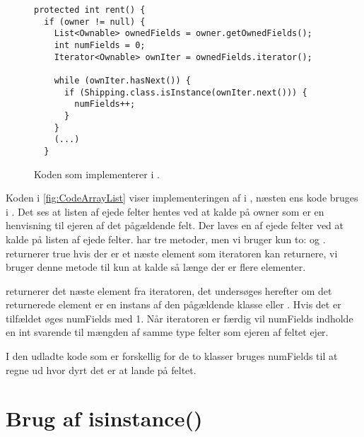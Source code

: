 \begin{figure}
\caption{Koden som implementerer  i .}
\label{fig:CodeIterator}
\centering
\begin{lstlisting}
protected int rent() {
  if (owner != null) {
    List<Ownable> ownedFields = owner.getOwnedFields();
    int numFields = 0;
    Iterator<Ownable> ownIter = ownedFields.iterator();

    while (ownIter.hasNext()) {
      if (Shipping.class.isInstance(ownIter.next())) {
        numFields++;
      }
    }
    (...)
  }
\end{lstlisting}
\end{figure}

Koden i \vref{fig:CodeArrayList} viser implementeringen af  i , næsten ens kode bruges i . Det ses at listen af ejede felter hentes ved at kalde  på owner som er en henvisning til ejeren af det pågældende felt. Der laves en  af ejede felter ved at kalde  på listen af ejede felter.  har tre metoder, men vi bruger kun to:  og .  returnerer true hvis der er et næste element som iteratoren kan returnere, vi bruger denne metode til kun at kalde  så længe der er flere elementer.\cite{javaUtilIterator}

 returnerer det næste element fra iteratoren, det undersøges herefter om det returnerede element er en instans af den pågældende klasse  eller . Hvis det er tilfældet øges numFields med 1. Når iteratoren er færdig vil numFields indholde en int svarende til mængden af samme type felter som ejeren af feltet ejer.

I den udladte kode som er forskellig for de to klasser bruges numFields til at regne ud hvor dyrt det er at lande på feltet.

\section{Brug af isinstance()}